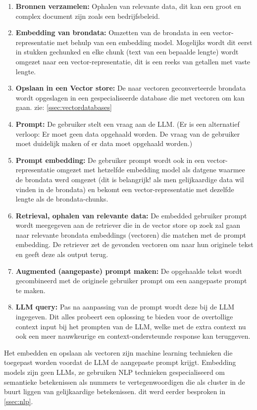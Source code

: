 \begin{enumerate}
    \item \textbf{Bronnen verzamelen:} Ophalen van relevante data, dit kan een groot en complex document zijn zoals een bedrijfsbeleid.
    \item \textbf{Embedding van brondata:} Omzetten van de brondata in een vector-representatie met behulp van een embedding model. Mogelijks wordt dit eerst in stukken gechunked en elke chunk (text van een bepaalde lengte) wordt omgezet naar een vector-representatie, dit is een reeks van getallen met vaste lengte.
    \item \textbf{Opslaan in een Vector store:} De naar vectoren geconverteerde brondata wordt opgeslagen in een gespecialiseerde database die met vectoren om kan gaan. zie: \ref{ssec:vectordatabases}
    \item \textbf{Prompt:} De gebruiker stelt een vraag aan de LLM. (Er is een alternatief verloop: Er moet geen data opgehaald worden. De vraag van de gebruiker moet duidelijk maken of er data moet opgehaald worden.)
    \item \textbf{Prompt embedding:} De gebruiker prompt wordt ook in een vector-representatie omgezet met hetzelfde embedding model als datgene waarmee de brondata werd omgezet (dit is belangrijk! als men gelijkaardige data wil vinden in de brondata) en bekomt een vector-representatie met dezelfde lengte als de brondata-chunks.
    \item \textbf{Retrieval, ophalen van relevante data:} De embedded gebruiker prompt wordt meegegeven aan de retriever die in de vector store op zoek zal gaan naar relevante brondata embeddings (vectoren) die matchen met de prompt embedding. De retriever zet de gevonden vectoren om naar hun originele tekst en geeft deze als output terug.
    \item \textbf{Augmented (aangepaste) prompt maken:} De opgehaalde tekst wordt gecombineerd met de originele gebruiker prompt om een aangepaste prompt te maken.
    \item \textbf{LLM query:} Pas na aanpassing van de prompt wordt deze bij de LLM ingegeven. Dit alles probeert een oplossing te bieden voor de overtollige context input bij het prompten van de LLM, welke met de extra context nu ook een meer nauwkeurige en context-ondersteunde response kan teruggeven.
\end{enumerate}

Het embedden en opslaan als vectoren zijn machine learning technieken die toegepast worden voordat de LLM de aangepaste prompt krijgt. Embedding models zijn geen LLMs, ze gebruiken NLP technieken gespecialiseerd om semantieke betekenissen als nummers te vertegenwoordigen die als cluster in de buurt liggen van gelijkaardige betekenissen. dit werd eerder besproken in \ref{ssec:nlp}. \\


